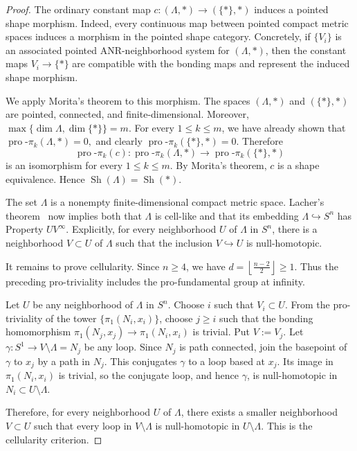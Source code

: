 \documentclass[12pt,oneside,a4paper]{article}
\theoremstyle{mytheorem}
\theoremstyle{remark}
\theoremstyle{definition}
\begin{document}
\begin{proof}
The ordinary constant map
\(c\colon(\Lambda,*)\to (\{*\},*)\)
induces a pointed shape morphism. Indeed, every continuous map between pointed compact metric spaces induces a morphism in the pointed shape category. Concretely, if
\(\{V_i\}\) is an associated pointed ANR-neighborhood system for
\((\Lambda,*)\), then the constant maps $V_i\to \{*\}$
are compatible with the bonding maps and represent the induced shape morphism.

We apply Morita's theorem to this morphism. The spaces \((\Lambda,*)\) and
\((\{*\},*)\) are pointed, connected, and finite-dimensional. Moreover,
$\max\{\dim\Lambda,\dim\{*\}\}=m.$
For every \(1\le k\le m\), we have already shown that $\operatorname{pro}\text{-}\pi_k(\Lambda,*)=0,$
and clearly $\operatorname{pro}\text{-}\pi_k(\{*\},*)=0.$
Therefore
\[
\operatorname{pro}\text{-}\pi_k(c)\colon
\operatorname{pro}\text{-}\pi_k(\Lambda,*)
\longrightarrow
\operatorname{pro}\text{-}\pi_k(\{*\},*)
\]
is an isomorphism for every \(1\le k\le m\). By Morita's theorem, \(c\) is a
shape equivalence. Hence \(\operatorname{Sh}(\Lambda)=\operatorname{Sh}(*)\).

The set \(\Lambda\) is a nonempty finite-dimensional compact metric space.
Lacher's theorem~\cite[Theorem~1.1]{zbMATH03290989} now implies both that
\(\Lambda\) is cell-like and that its embedding
\(\Lambda\hookrightarrow S^n\) has Property \(UV^\infty\). Explicitly, for
every neighborhood \(U\) of \(\Lambda\) in \(S^n\), there is a neighborhood
\(V\subset U\) of \(\Lambda\) such that the inclusion
\(V\hookrightarrow U\) is null-homotopic.

It remains to prove cellularity. Since \(n\ge4\), we have
$d=\left\lfloor\frac{n-2}{2}\right\rfloor\ge1.$
Thus the preceding pro-triviality includes the pro-fundamental group at
infinity.

Let \(U\) be any neighborhood of \(\Lambda\) in \(S^n\). Choose \(i\) such that
$V_i\subset U.$
From the pro-triviality of the tower \(\{\pi_1(N_i,x_i)\}\), choose \(j\ge i\)
such that the bonding homomorphism
$\pi_1(N_j,x_j)\to \pi_1(N_i,x_i)$ is trivial. Put $V:=V_j.$
Let $\gamma\colon S^1\to V\setminus\Lambda=N_j$
be any loop. Since \(N_j\) is path connected, join the basepoint of \(\gamma\)
to \(x_j\) by a path in \(N_j\). This conjugates \(\gamma\) to a loop based at
\(x_j\). Its image in \(\pi_1(N_i,x_i)\) is trivial, so the conjugate loop, and
hence \(\gamma\), is null-homotopic in $N_i\subset U\setminus\Lambda.$

Therefore, for every neighborhood \(U\) of \(\Lambda\), there exists a smaller
neighborhood \(V\subset U\) such that every loop in
$V\setminus\Lambda$ is null-homotopic in $U\setminus\Lambda.$
This is the cellularity criterion.


\end{proof}
\end{document}
